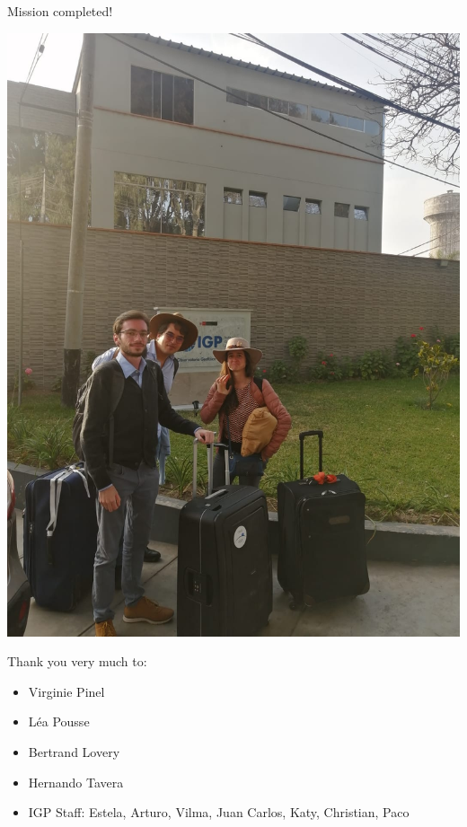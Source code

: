 \documentclass{beamer}
\begin{document}
\begin{frame}
 
 {Mission completed!}
 
 \begin{minipage}{0.45\linewidth}
  \vskip 1cm
   \includegraphics[width=1\linewidth]{images/Lima5}
 \end{minipage}
 \begin{minipage}{0.45\linewidth}
 Thank you very much to:
  \begin{itemize}
   \item Virginie Pinel
   \item L\'ea Pousse
   \item Bertrand Lovery
   \item Hernando Tavera
   \item IGP Staff: Estela, Arturo, Vilma, Juan Carlos, Katy, Christian, Paco
  \end{itemize}

 
 \end{minipage}

 
\end{frame}
\end{document}
